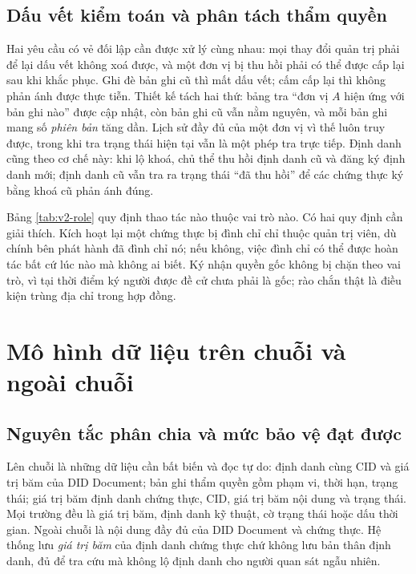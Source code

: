 \subsection{Dấu vết kiểm toán và phân tách thẩm quyền}

Hai yêu cầu có vẻ đối lập cần được xử lý cùng nhau: mọi thay đổi quản trị phải để lại dấu vết không xoá được, và một đơn vị bị thu hồi phải có thể được cấp lại sau khi khắc phục. Ghi đè bản ghi cũ thì mất dấu vết; cấm cấp lại thì không phản ánh được thực tiễn. Thiết kế tách hai thứ: bảng tra ``đơn vị $A$ hiện ứng với bản ghi nào'' được cập nhật, còn bản ghi cũ vẫn nằm nguyên, và mỗi bản ghi mang số \emph{phiên bản} tăng dần. Lịch sử đầy đủ của một đơn vị vì thế luôn truy được, trong khi tra trạng thái hiện tại vẫn là một phép tra trực tiếp. Định danh cũng theo cơ chế này: khi lộ khoá, chủ thể thu hồi định danh cũ và đăng ký định danh mới; định danh cũ vẫn tra ra trạng thái ``đã thu hồi'' để các chứng thực ký bằng khoá cũ phản ánh đúng.

Bảng \ref{tab:v2-role} quy định thao tác nào thuộc vai trò nào. Có hai quy định cần giải thích. Kích hoạt lại một chứng thực bị đình chỉ chỉ thuộc quản trị viên, dù chính bên phát hành đã đình chỉ nó; nếu không, việc đình chỉ có thể được hoàn tác bất cứ lúc nào mà không ai biết. Ký nhận quyền gốc không bị chặn theo vai trò, vì tại thời điểm ký người được đề cử chưa phải là gốc; rào chắn thật là điều kiện trùng địa chỉ trong hợp đồng.



\section{Mô hình dữ liệu trên chuỗi và ngoài chuỗi}
\label{sec:mo-hinh-du-lieu}

\subsection{Nguyên tắc phân chia và mức bảo vệ đạt được}

Lên chuỗi là những dữ liệu cần bất biến và đọc tự do: định danh cùng CID và giá trị băm của DID Document; bản ghi thẩm quyền gồm phạm vi, thời hạn, trạng thái; giá trị băm định danh chứng thực, CID, giá trị băm nội dung và trạng thái. Mọi trường đều là giá trị băm, định danh kỹ thuật, cờ trạng thái hoặc dấu thời gian. Ngoài chuỗi là nội dung đầy đủ của DID Document và chứng thực. Hệ thống lưu \emph{giá trị băm} của định danh chứng thực chứ không lưu bản thân định danh, đủ để tra cứu mà không lộ định danh cho người quan sát ngẫu nhiên.

